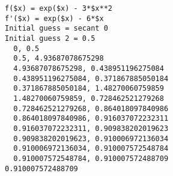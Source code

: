 \begin{verbatim}
f($x) = exp($x) - 3*$x**2
f'($x) = exp($x) - 6*$x
Initial guess = secant 0
Initial guess 2 = 0.5
  0, 0.5
  0.5, 4.93687078675298
  4.93687078675298, 0.438951196275084
  0.438951196275084, 0.371867885050184
  0.371867885050184, 1.48270060759859
  1.48270060759859, 0.728462521279268
  0.728462521279268, 0.864018097840986
  0.864018097840986, 0.916037072232311
  0.916037072232311, 0.909838202019623
  0.909838202019623, 0.910006972136034
  0.910006972136034, 0.910007572548784
  0.910007572548784, 0.910007572488709
0.910007572488709
\end{verbatim}
